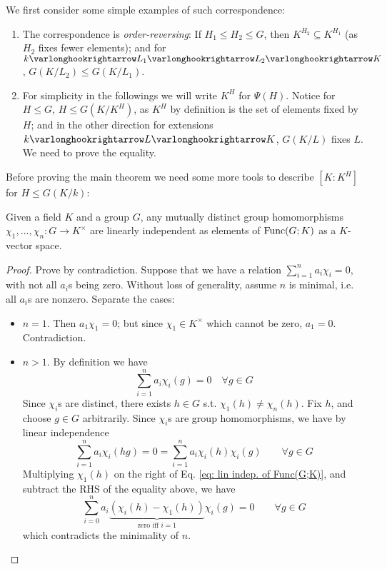 \begin{remark}
    We first consider some simple examples of such correspondence:
    \begin{enumerate}[label=\arabic*)]
        \item The correspondence is \emph{order-reversing}: If $H_1 \leq H_2 \leq G$, then $K^{H_2} \subseteq K^{H_1}$ (as $H_2$ fixes fewer elements); and for $k \ext L_1 \ext L_2 \ext K$, $G(K/L_2) \leq G(K/L_1)$.
        \item For simplicity in the followings we will write $K^H$ for $\Psi(H)$. Notice for $H \leq G$, $H \leq G(K/K^H)$, as $K^H$ by definition is the set of elements fixed by $H$; and in the other direction for extensions $k \ext L \ext K$, $G(K/L)$ fixes $L$. We need to prove the equality. 
    \end{enumerate}
\end{remark}

\textstart
Before proving the main theorem we need some more tools to describe $[K : K^H]$ for $H \leq G(K/k)$:

\begin{proposition}
    Given a field $K$ and a group $G$, any mutually distinct group homomorphisms $\chi_1, \dots, \chi_n: G \to K^{\times}$ are linearly independent as elements of $\mathrm{Func}(G;K)$ as a $K$-vector space.
\end{proposition}

\begin{proof}
    Prove by contradiction. Suppose that we have a relation $\sum_{i = 1}^n a_i \chi_i = 0$, with not all $a_i$s being zero. Without loss of generality, assume $n$ is minimal, i.e. all $a_i$s are nonzero. Separate the cases:
    \begin{itemize}
        \item $n = 1$. Then $a_1 \chi_1 = 0$; but since $\chi_1 \in K^{\times}$ which cannot be zero, $a_1 = 0$. Contradiction.
        \item $n > 1$. By definition we have
        \begin{equation}\tag{$\ast$}\label{eq: lin indep. of Func(G;K)}
            \sum_{i = 1}^n a_i\chi_i(g) = 0 \quad \forall g \in G
        \end{equation}
        Since $\chi_i$s are distinct, there exists $h \in G$ s.t. $\chi_1(h) \neq \chi_n(h)$. Fix $h$, and choose $g \in G$ arbitrarily. Since $\chi_i$s are group homomorphisms, we have by linear independence
        \[
            \sum_{i = 1}^n a_i \chi_i(hg) = 0 = \sum_{i = 1}^n a_i \chi_i(h) \chi_i(g) \qquad \forall g \in G
        \]
        Multiplying $\chi_1(h)$ on the right of Eq. \eqref{eq: lin indep. of Func(G;K)}, and subtract the RHS of the equality above, we have
        \[
            \sum_{i = 0}^n a_i \underbrace{(\chi_i(h) - \chi_1(h))}_{\text{zero iff $i = 1$}} \chi_i(g) = 0 \qquad \forall g \in G
        \]
        which contradicts the minimality of $n$.
    \end{itemize}
\end{proof}

